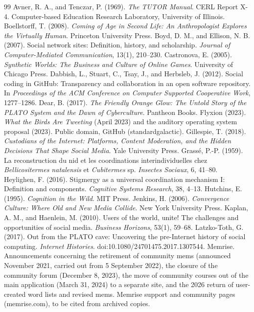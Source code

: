 \documentclass[11pt]{article}
\theoremstyle{remark}
\begin{document}
\begin{thebibliography}{99}
 Avner, R. A., and Tenczar, P. (1969). \emph{The TUTOR Manual}. CERL Report X-4. Computer-based Education Research Laboratory, University of Illinois.
 Boellstorff, T. (2008). \emph{Coming of Age in Second Life: An Anthropologist Explores the Virtually Human}. Princeton University Press.
 Boyd, D. M., and Ellison, N. B. (2007). Social network sites: Definition, history, and scholarship. \emph{Journal of Computer-Mediated Communication}, 13(1), 210--230.
 Castronova, E. (2005). \emph{Synthetic Worlds: The Business and Culture of Online Games}. University of Chicago Press.
 Dabbish, L., Stuart, C., Tsay, J., and Herbsleb, J. (2012). Social coding in GitHub: Transparency and collaboration in an open software repository. In \emph{Proceedings of the ACM Conference on Computer Supported Cooperative Work}, 1277--1286.
 Dear, B. (2017). \emph{The Friendly Orange Glow: The Untold Story of the PLATO System and the Dawn of Cyberculture}. Pantheon Books.
 Flyxion (2023). \emph{What the Birds Are Tweeting} (April 2023) and the auditory operating system proposal (2023). Public domain, GitHub (standardgalactic).
 Gillespie, T. (2018). \emph{Custodians of the Internet: Platforms, Content Moderation, and the Hidden Decisions That Shape Social Media}. Yale University Press.
 Grass\'e, P.-P. (1959). La reconstruction du nid et les coordinations interindividuelles chez \emph{Bellicositermes natalensis} et \emph{Cubitermes} sp. \emph{Insectes Sociaux}, 6, 41--80.
 Heylighen, F. (2016). Stigmergy as a universal coordination mechanism I: Definition and components. \emph{Cognitive Systems Research}, 38, 4--13.
 Hutchins, E. (1995). \emph{Cognition in the Wild}. MIT Press.
 Jenkins, H. (2006). \emph{Convergence Culture: Where Old and New Media Collide}. New York University Press.
 Kaplan, A. M., and Haenlein, M. (2010). Users of the world, unite! The challenges and opportunities of social media. \emph{Business Horizons}, 53(1), 59--68.
 Latzko-Toth, G. (2017). Out from the PLATO cave: Uncovering the pre-Internet history of social computing. \emph{Internet Histories}. doi:10.1080/24701475.2017.1307544.
 Memrise. Announcements concerning the retirement of community mems (announced November 2021, carried out from 5 September 2022), the closure of the community forum (December 8, 2023), the move of community courses out of the main application (March 31, 2024) to a separate site, and the 2026 return of user-created word lists and revised mems. Memrise support and community pages (memrise.com), to be cited from archived copies.

\end{thebibliography}
\end{document}
